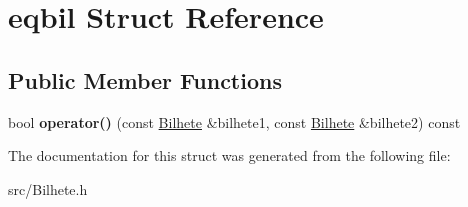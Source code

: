 \hypertarget{structeqbil}{}\section{eqbil Struct Reference}
\label{structeqbil}
\subsection*{Public Member Functions}
\begin{DoxyCompactItemize}
\item 
\hypertarget{structeqbil_ada6bef97b45992635433fa81bce3dbc4}{}bool {\bfseries operator()} (const \hyperlink{class_bilhete}{Bilhete} \&bilhete1, const \hyperlink{class_bilhete}{Bilhete} \&bilhete2) const \label{structeqbil_ada6bef97b45992635433fa81bce3dbc4}

\end{DoxyCompactItemize}


The documentation for this struct was generated from the following file\+:\begin{DoxyCompactItemize}
\item 
src/Bilhete.\+h\end{DoxyCompactItemize}
